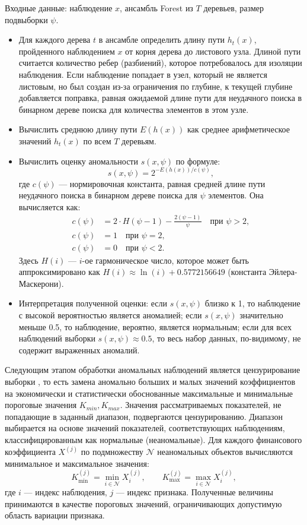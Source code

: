 \documentclass[14pt,a4paper]{extarticle}
\begin{document}
Входные данные: наблюдение $x$, ансамбль Forest из $T$ деревьев, размер подвыборки $\psi$.
\begin{itemize}
    \item[Шаг 1.] Для каждого дерева $t$ в ансамбле определить длину пути $h_{t}(x)$, пройденного наблюдением $x$ от корня дерева до листового узла. Длиной пути считается количество ребер (разбиений), которое потребовалось для изоляции наблюдения. Если наблюдение попадает в узел, который не является листовым, но был создан из-за ограничения по глубине, к текущей глубине добавляется поправка, равная ожидаемой длине пути для неудачного поиска в бинарном дереве поиска для количества элементов в этом узле.\\
    \item[Шаг 2.] Вычислить среднюю длину пути $E(h(x))$ как среднее арифметическое значений $h_{t}(x)$ по всем $T$ деревьям.\\
    \item[Шаг 3.] Вычислить оценку аномальности $s(x, \psi)$ по формуле:
        \[s(x, \psi) = 2^{ -E(h(x)) / c(\psi) },\]
        где $c(\psi)$ --- нормировочная константа, равная средней длине пути неудачного поиска в бинарном дереве поиска для $\psi$ элементов. Она вычисляется как:
        \begin{align*}
        c(\psi) &= 2 \cdot H(\psi - 1) - \frac{2(\psi - 1)}{\psi} \quad \text{при } \psi > 2,\\
        c(\psi) &= 1 \quad \text{при } \psi = 2,\\
        c(\psi) &= 0 \quad \text{при } \psi < 2.
        \end{align*}
        Здесь $H(i)$ --- $i$-ое гармоническое число, которое может быть аппроксимировано как $H(i) \approx \ln(i) + 0.5772156649$ (константа Эйлера-Маскерони).

    \item[Шаг 4.] Интерпретация полученной оценки: если $s(x, \psi)$ близко к 1, то наблюдение с высокой вероятностью является аномалией; если $s(x, \psi)$ значительно меньше 0.5, то наблюдение, вероятно, является нормальным; если для всех наблюдений выборки $s(x, \psi) \approx 0.5$, то весь набор данных, по-видимому, не содержит выраженных аномалий.
\end{itemize}

Следующим этапом обработки аномальных наблюдений является цензурирование выборки \cite{malugin2013.2}, то есть 
замена аномально больших и малых значений коэффициентов на экономически и статистически
обоснованные максимальные и минимальные пороговые значения $K_{min}, K_{max}$. Значения рассматриваемых 
показателей, не попадающие в заданный диапазон, подвергаются цензурированию. Диапазон выбирается на основе 
значений показателей, соответствующих наблюдениям, классифицированным как нормальные (неаномальные). Для 
каждого финансового коэффициента $X^{(j)}$ по подмножеству $\mathcal{N}$ неаномальных объектов вычисляются 
минимальное и максимальное значения:
\[
K_{\min}^{(j)} = \min_{i \in \mathcal{N}} X_i^{(j)}, \qquad 
K_{\max}^{(j)} = \max_{i \in \mathcal{N}} X_i^{(j)},
\]
где $i$ — индекс наблюдения, $j$ — индекс признака. Полученные величины принимаются в качестве пороговых 
значений, ограничивающих допустимую область вариации признака.
\end{document}
